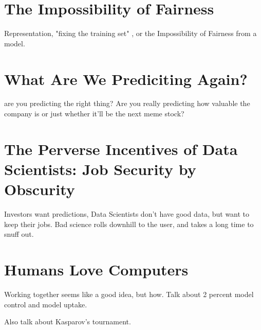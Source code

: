 \section{The Impossibility of Fairness}

Representation, "fixing the training set" , or the Impossibility of Fairness from a model.

\section{What Are We Prediciting Again?}

are you predicting the right thing? Are you really predicting how valuable the company is or just whether it'll be the next meme stock?

\section{The Perverse Incentives of Data Scientists: Job Security by Obscurity}

Investors want predictions, Data Scientists don't have good data, but want to keep their jobs. Bad science rolls downhill to the user, and takes a long time to snuff out. 

\section{Humans Love Computers}

Working together seems like a good idea, but how. Talk about 2 percent model control and model uptake. 

Also talk about Kasparov's tournament. 


